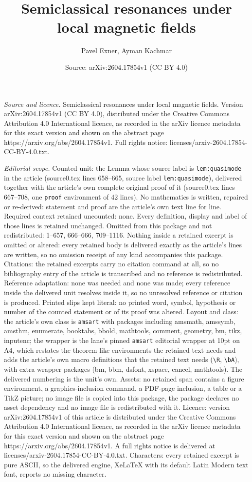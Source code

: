 \documentclass[10pt,a4paper]{amsart}
\title[Semiclassical resonances under local magnetic fields]{Semiclassical resonances under local magnetic fields}
\author{Pavel Exner, Ayman Kachmar}
\date{Source: arXiv:2604.17854v1 (CC BY 4.0)}
\begin{document}
\maketitle

\noindent\emph{Source and licence.} Semiclassical resonances under local magnetic fields. Version arXiv:2604.17854v1 (CC BY 4.0), distributed under the Creative Commons Attribution 4.0 International licence, as recorded in the arXiv licence metadata for this exact version and shown on the abstract page https://arxiv.org/abs/2604.17854v1. Full rights notice: licenses/arxiv-2604.17854-CC-BY-4.0.txt.\par\smallskip

\noindent\textit{Editorial scope.} Counted unit: the Lemma whose source label is \texttt{lem:quasimode} in the article (source0.tex lines 658--665, source label \texttt{lem:quasimode}), delivered together with the article's own complete original proof of it (source0.tex lines 667--708, one \texttt{proof} environment of 42 lines). No mathematics is written, repaired or re-derived: statement and proof are the article's own text line for line. Required context retained uncounted: none. Every definition, display and label of those lines is retained unchanged. Omitted from this package and not redistributed: 1--657, 666--666, 709--1116. Nothing inside a retained excerpt is omitted or altered: every retained body is delivered exactly as the article's lines are written, so no omission receipt of any kind accompanies this package. Citations: the retained excerpts carry no citation command at all, so no bibliography entry of the article is transcribed and no reference is redistributed. Reference adaptation: none was needed and none was made; every reference inside the delivered unit resolves inside it, so no unresolved reference or citation is produced. Printed slips kept literal: no printed word, symbol, hypothesis or number of the counted statement or of its proof was altered. Layout and class: the article's own class is \texttt{amsart} with packages including amsmath, amssymb, amsthm, enumerate, booktabs, bbold, mathtools, comment, geometry, bm, tikz, inputenc; the wrapper is the lane's pinned \texttt{amsart} editorial wrapper at 10pt on A4, which restates the theorem-like environments the retained text needs and adds the article's own macro definitions that the retained text needs (\texttt{\textbackslash R}, \texttt{\textbackslash bA}), with extra wrapper packages (bm, bbm, dsfont, xspace, cancel, mathtools). The delivered numbering is the unit's own. Assets: no retained span contains a figure environment, a graphics-inclusion command, a PDF-page inclusion, a table or a TikZ picture; no image file is copied into this package, the package declares no asset dependency and no image file is redistributed with it. Licence: version arXiv:2604.17854v1 of this article is distributed under the Creative Commons Attribution 4.0 International licence, as recorded in the arXiv licence metadata for this exact version and shown on the abstract page https://arxiv.org/abs/2604.17854v1. A full rights notice is delivered at licenses/arxiv-2604.17854-CC-BY-4.0.txt. Characters: every retained excerpt is pure ASCII, so the delivered engine, XeLaTeX with its default Latin Modern text font, reports no missing character.
\end{document}
